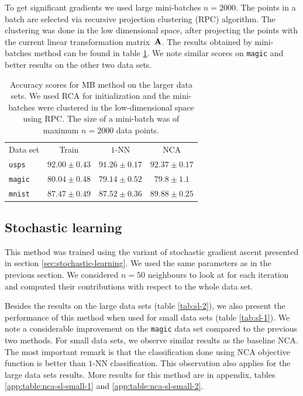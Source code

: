     To get significant gradients we used large mini-batches $n=2000$. The points in a batch are selected via recursive projection clustering (RPC) algorithm. The clustering was done in the low dimensional space, after projecting the points with the current linear transformation matrix~$\mathbf{A}$.
    The results obtained by mini-batches method can be found in table \ref{tab:mb}. We note similar scores on \texttt{magic} and better results on the other two data sets.

    \begin{table}
        	\centering
        	\begin{tabular}{lccc}
        	\toprule
        	Data set & Train & $1$-NN & NCA \\
        	\cmidrule(r){2-2}\cmidrule(r){3-4}
        	 \texttt{usps}&$92.00 \pm 0.43$&$91.26 \pm 0.17$&$92.37 \pm 0.17$\\
        	 \texttt{magic}&$80.04 \pm 0.48$&$79.14 \pm 0.52$&$79.8 \pm 1.1$\\
        	 \texttt{mnist}&$87.47 \pm 0.49$&$87.52 \pm 0.36$&$89.88 \pm 0.25$\\
        	 \bottomrule
        	\end{tabular}
		\label{tab:mb}
		\caption{Accuracy scores for MB method on the larger data sets. We used RCA for initialization and the mini-batches were clustered in the low-dimensional space using RPC. The size of a mini-batch was of maximum $n=2000$ data points.}
    \end{table}

    \subsection{Stochastic learning}
    \label{subsec:eval-stochastic-learning}

    This method was trained using the variant of stochastic gradient ascent presented in section \ref{sec:stochastic-learning}. We used the same parameters as in the previous section. We considered $n=50$ neighbours to look at for each iteration and computed their contributions with respect to the whole data set. 

    Besides the results on the large data sets (table \ref{tab:sl-2}), we also present the performance of this method when used for small data sets (table \ref{tab:sl-1}). We note a considerable improvement on the \texttt{magic} data set compared to the previous two methods. For small data sets, we observe similar results as the baseline NCA. The most important remark is that the classification done using NCA objective function is better than $1$-NN classification. This observation also applies for the large data sets results. More results for this method are in appendix, tables \ref{app:table:nca-sl-small-1} and \ref{app:table:nca-sl-small-2}. 

